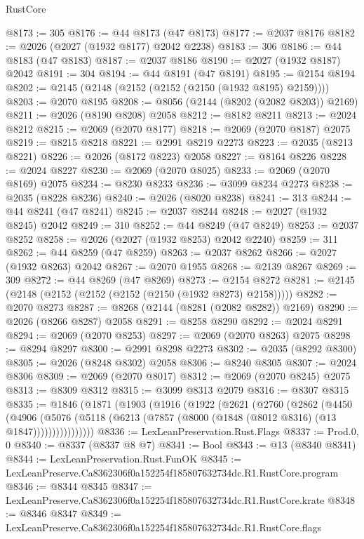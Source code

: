 \begin{lexlean}{RustCore}
\begin{coremodule}
@8173 := 305
@8176 := @44 @8173 (@47 @8173)
@8177 := @2037 @8176
@8182 := @2026 (@2027 (@1932 @8177) @2042 @2238)
@8183 := 306
@8186 := @44 @8183 (@47 @8183)
@8187 := @2037 @8186
@8190 := @2027 (@1932 @8187) @2042
@8191 := 304
@8194 := @44 @8191 (@47 @8191)
@8195 := @2154 @8194
@8202 := @2145 (@2148 (@2152 (@2152 (@2150 (@1932 @8195) @2159))))
@8203 := @2070 @8195
@8208 := @8056 (@2144 (@8202 (@2082 @8203)) @2169)
@8211 := @2026 (@8190 @8208) @2058
@8212 := @8182 @8211
@8213 := @2024 @8212
@8215 := @2069 (@2070 @8177)
@8218 := @2069 (@2070 @8187) @2075
@8219 := @8215 @8218
@8221 := @2991 @8219 @2273
@8223 := @2035 (@8213 @8221)
@8226 := @2026 (@8172 @8223) @2058
@8227 := @8164 @8226
@8228 := @2024 @8227
@8230 := @2069 (@2070 @8025)
@8233 := @2069 (@2070 @8169) @2075
@8234 := @8230 @8233
@8236 := @3099 @8234 @2273
@8238 := @2035 (@8228 @8236)
@8240 := @2026 (@8020 @8238)
@8241 := 313
@8244 := @44 @8241 (@47 @8241)
@8245 := @2037 @8244
@8248 := @2027 (@1932 @8245) @2042
@8249 := 310
@8252 := @44 @8249 (@47 @8249)
@8253 := @2037 @8252
@8258 := @2026 (@2027 (@1932 @8253) @2042 @2240)
@8259 := 311
@8262 := @44 @8259 (@47 @8259)
@8263 := @2037 @8262
@8266 := @2027 (@1932 @8263) @2042
@8267 := @2070 @1955
@8268 := @2139 @8267
@8269 := 309
@8272 := @44 @8269 (@47 @8269)
@8273 := @2154 @8272
@8281 := @2145 (@2148 (@2152 (@2152 (@2152 (@2150 (@1932 @8273) @2158)))))
@8282 := @2070 @8273
@8287 := @8268 (@2144 (@8281 (@2082 @8282)) @2169)
@8290 := @2026 (@8266 @8287) @2058
@8291 := @8258 @8290
@8292 := @2024 @8291
@8294 := @2069 (@2070 @8253)
@8297 := @2069 (@2070 @8263) @2075
@8298 := @8294 @8297
@8300 := @2991 @8298 @2273
@8302 := @2035 (@8292 @8300)
@8305 := @2026 (@8248 @8302) @2058
@8306 := @8240 @8305
@8307 := @2024 @8306
@8309 := @2069 (@2070 @8017)
@8312 := @2069 (@2070 @8245) @2075
@8313 := @8309 @8312
@8315 := @3099 @8313 @2079
@8316 := @8307 @8315
@8335 := @1846
    (@1871
      (@1903
        (@1916
          (@1922
            (@2621
              (@2760
                (@2862
                  (@4450
                    (@4906
                      (@5076
                        (@5118 (@6213 (@7857 (@8000 (@1848 (@8012 @8316) (@13 @1847))))))))))))))))
@8336 := LexLeanPreservation.Rust.Flags
@8337 := Prod.{0, 0}
@8340 := @8337 (@8337 @8 @7)
@8341 := Bool
@8343 := @13 (@8340 @8341)
@8344 := LexLeanPreservation.Rust.FunOK
@8345 := LexLeanPreserve.Ca8362306f0a152254f185807632734dc.R1.RustCore.program
@8346 := @8344 @8345
@8347 := LexLeanPreserve.Ca8362306f0a152254f185807632734dc.R1.RustCore.krate
@8348 := @8346 @8347
@8349 := LexLeanPreserve.Ca8362306f0a152254f185807632734dc.R1.RustCore.flags

\end{coremodule}
\end{lexlean}
